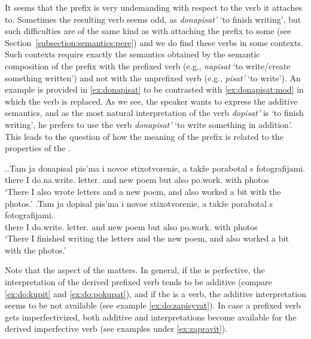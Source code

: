 It seems that the prefix  is very undemanding with respect to the verb it attaches to. Sometimes the resulting verb seems odd, as \textit{donapisat'} `to finish writing', but such difficulties are of the same kind as with attaching the  prefix  to some  (see Section~\ref{subsection:semantics:pere}) and we do find these verbs in some contexts. Such contexts require exactly the semantics obtained by the semantic composition of the prefix  with the prefixed verb (e.g., \textit{napisat} `to write/create something written') and not with the unprefixed verb (e.g., \textit{pisat'} `to write'). An example is provided in \ref{ex:donapisat} to be contrasted with \ref{ex:donapisat:mod} in which the verb is replaced. As we see, the speaker wants to express the additive semantics, and as the most natural interpretation of the verb \textit{dopisat'} is `to finish writing', he prefers to use the verb \textit{donapisat'} `to write something in addition'. This leads to the question of how the meaning of the prefix is related to the properties of the .

\ex.\ag.\label{ex:donapisat}Tam ja donapisal pis'ma i novoe stixotvorenie, a tak\v{z}e porabotal s fotografijami.\\
there I do.na.write. letter. and new poem but also po.work. with photos\\
\trans `There I also wrote letters and a new poem, and also worked a bit with the photos.'
\bg.\label{ex:donapisat:mod}Tam ja dopisal pis'ma i novoe stixotvorenie, a tak\v{z}e porabotal s fotografijami.\\
there I do.write. letter. and new poem but also po.work. with photos\\
\trans `There I finished writing the letters and the new poem, and also worked a bit with the photos.'

Note that the aspect of the  matters. In general, if the  is perfective, the interpretation of the derived prefixed verb tends to be additive (compare \ref{ex:do:kupit} and \ref{ex:do:pokupat}), and if the  is a  verb, the additive interpretation seems to be not available (see example \ref{ex:do:zapisyvat}). In case a prefixed verb gets imperfectivized, both additive and  interpretations become available for the derived imperfective verb (see examples under \ref{ex:zapravit}).

